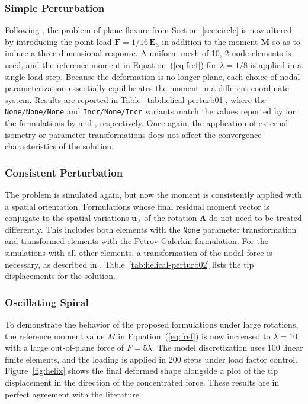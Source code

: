 \subsubsection{Simple Perturbation}
Following \cite{ibrahimbegović1995computational}, the problem of plane flexure from Section~\ref{sec:circle} is now altered by introducing the point load
\(\boldsymbol{F} = 1/16 \, \mathbf{E}_3\) in addition to the moment \(\boldsymbol{M}\) so as to induce
a three-dimensional response. 
A uniform mesh of 10, 2-node elements is used, and the reference moment in Equation~(\ref{eq:fref}) for \(\lambda = 1/8\) is applied in a single load step. 
Because the deformation is no longer plane, each choice of nodal parameterization essentially equilibriates the moment in a different coordinate system. %
Results are reported in Table~\ref{tab:helical-perturb01}, where the \texttt{None/None/None} and \texttt{Incr/None/Incr} 
variants match the values reported by \cite{ibrahimbegović1995computational} for the formulations by 
\cite{simo1986threedimensional} and \cite{ibrahimbegović1995computational}, respectively.
Once again, the application of external isometry or parameter transformations does not affect the convergence characteristics of the solution.
%


\subsubsection{Consistent Perturbation}
The problem is simulated again, but now the moment is consistently applied with a spatial orientation.
Formulations whose final residual moment vector is conjugate to the spatial variations \(\boldsymbol{u}_{\scriptscriptstyle{\Lambda}}\) of the rotation \(\boldsymbol{\Lambda}\) do not need to be treated differently.
This includes both elements with the \texttt{None} parameter transformation and transformed elements with the Petrov-Galerkin formulation.
For the simulations with all other elements, a transformation of the nodal force is necessary, as described in \cite{ritto-corrêa2002differentiation,ritto-corrêa2003workconjugacy}.
Table~\ref{tab:helical-perturb02} lists the tip displacements for the solution. 
%


\hypertarget{sec:helix}{%
\subsubsection{Oscillating Spiral}\label{sec:helix}}
%
To demonstrate the behavior of the
proposed formulations under large rotations, the reference moment value $M$ in Equation~(\ref{eq:fref}) is now increased to \(\lambda=10\) with a large out-of-plane force of \(F=5 \lambda\).
The model discretization uses 100 linear finite elements, and the loading is applied in 200 steps under load factor control.
Figure~\ref{fig:helix} shows the final deformed shape alongside a plot of the tip displacement in the direction of the concentrated force.
These results are in perfect agreement with %
the literature \citep{zupan2003finiteelement,makinen2007total,ghosh2009frameinvariant,lolić2020consistent,harsch2023total}.
